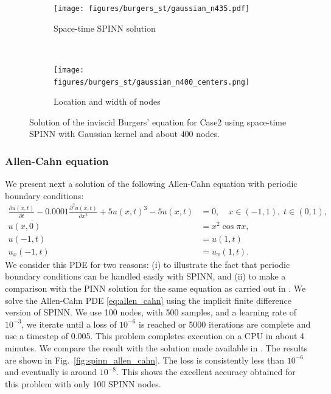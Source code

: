 \documentclass[12pt]{article}
\newcommand{\rr}[1]{#1}
\begin{document}
\begin{figure}
\centering
\begin{subfigure}{0.45\textwidth}
\texttt{[image: figures/burgers\_st/gaussian\_n435.pdf]}
\caption{Space-time SPINN solution}
\label{fig:spinn_burgers_a}
\end{subfigure}
~
\begin{subfigure}{0.5\textwidth}
\texttt{[image: figures/burgers\_st/gaussian\_n400\_centers.png]}
\caption{Location and width of nodes}
\label{fig:spinn_burgers_b}
\end{subfigure}
\caption{Solution of the inviscid Burgers' equation for Case2 using space-time SPINN with Gaussian kernel and about $400$ nodes.}
\label{fig:spinn_burgers}
\end{figure}

\subsubsection{Allen-Cahn equation}
\label{subsec:allencahn}

\rr{
We present next a solution of the following Allen-Cahn equation with periodic boundary conditions:
\begin{equation} \label{eq:allen_cahn}
\begin{split}
\frac{\partial u(x,t)}{\partial t} - 0.0001\frac{\partial^2 u(x,t)}{\partial x^2} + 5u(x,t)^3 - 5u(x,t) & = 0, \quad x \in (-1,1), \; t \in (0,1),\\
u(x,0) &= x^2 \cos \pi x,\\
u(-1,t) &= u(1,t)\\
u_x(-1,t) &= u_x(1,t).
\end{split}
\end{equation}
We consider this PDE for two reasons: (i) to illustrate the fact that periodic boundary conditions can be handled easily with SPINN, and (ii) to make a comparison with the PINN solution for the same equation as carried out in \cite{RPK2019}. We solve the Allen-Cahn PDE \eqref{eq:allen_cahn} using the implicit finite difference version of SPINN. We use 100 nodes, with 500 samples, and a learning rate of $10^{-3}$, we iterate until a loss of $10^{-6}$ is reached or 5000 iterations are complete and use a timestep of 0.005. This problem completes execution on a CPU in about 4 minutes. We compare the result with the solution made available in \cite{RPK2019}. The results are shown in Fig.~\ref{fig:spinn_allen_cahn}.  The loss is consistently less than $10^{-6}$ and eventually is around $10^{-8}$. This shows the excellent accuracy obtained for this problem with only 100 SPINN nodes.
}
\end{document}
